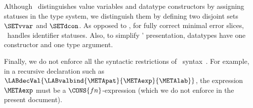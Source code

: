 \documentclass{jfp1}
\newcommand{\sizeintablesp}{footnotesize}
\begin{document}
Although \SML\ distinguishes value variables and datatype constructors
by assigning statuses in the type system, we distinguish them by
defining two disjoint sets $\SETvvar$ and $\SETdcon$.
%
As opposed to \CORETES, for fully correct minimal error slices,
\FORMTES\ handles identifier statuses.
%
Also, to simplify  \CORETES' presentation, datatypes have one
constructor and one type argument.




Finally, we do not enforce all the syntactic restrictions of \SML\
syntax~\cite{Milner+Tofte+Harper+Macqueen:1997}.  For example,
in a recursive declaration such as
$\LABdecVal{\LABvalbind{\METApat}{\METAexp}{\METAlab}}$, the
expression $\METAexp$ must be a $\CONS{fn}$-expression (which we do
not enforce in the present document).





\end{document}

